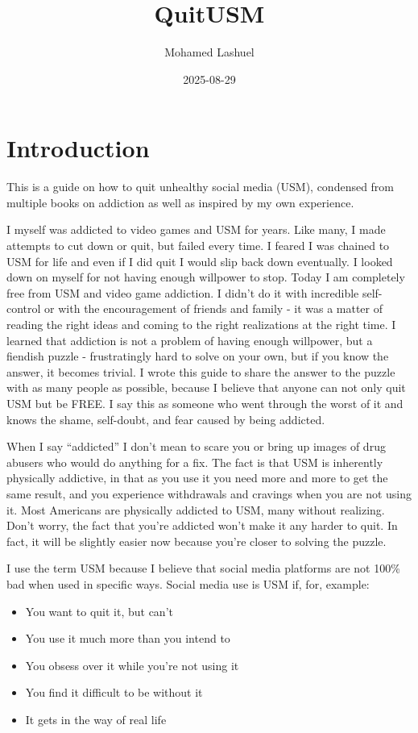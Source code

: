 \documentclass[
  openany]{book}
\title{QuitUSM}
\author{Mohamed Lashuel}
\date{2025-08-29}
\providecommand{\tightlist}{%
  \setlength{\itemsep}{0pt}\setlength{\parskip}{0pt}}
\begin{document}
\maketitle

{
\setcounter{tocdepth}{1}
\tableofcontents
}
\chapter{Introduction}\label{introduction}

This is a guide on how to quit unhealthy social media (USM), condensed from multiple books on addiction as well as inspired by my own experience.

I myself was addicted to video games and USM for years. Like many, I made attempts to cut down or quit, but failed every time. I feared I was chained to USM for life and even if I did quit I would slip back down eventually. I looked down on myself for not having enough willpower to stop. Today I am completely free from USM and video game addiction. I didn't do it with incredible self-control or with the encouragement of friends and family - it was a matter of reading the right ideas and coming to the right realizations at the right time. I learned that addiction is not a problem of having enough willpower, but a fiendish puzzle - frustratingly hard to solve on your own, but if you know the answer, it becomes trivial. I wrote this guide to share the answer to the puzzle with as many people as possible, because I believe that anyone can not only quit USM but be FREE. I say this as someone who went through the worst of it and knows the shame, self-doubt, and fear caused by being addicted.

When I say ``addicted'' I don't mean to scare you or bring up images of drug abusers who would do anything for a fix. The fact is that USM is inherently physically addictive, in that as you use it you need more and more to get the same result, and you experience withdrawals and cravings when you are not using it. Most Americans are physically addicted to USM, many without realizing. Don't worry, the fact that you're addicted won't make it any harder to quit. In fact, it will be slightly easier now because you're closer to solving the puzzle.

I use the term USM because I believe that social media platforms are not 100\% bad when used in specific ways. Social media use is USM if, for, example:

\begin{itemize}
\tightlist
\item
  You want to quit it, but can't
\item
  You use it much more than you intend to
\item
  You obsess over it while you're not using it
\item
  You find it difficult to be without it
\item
  It gets in the way of real life
\end{itemize}
\end{document}

